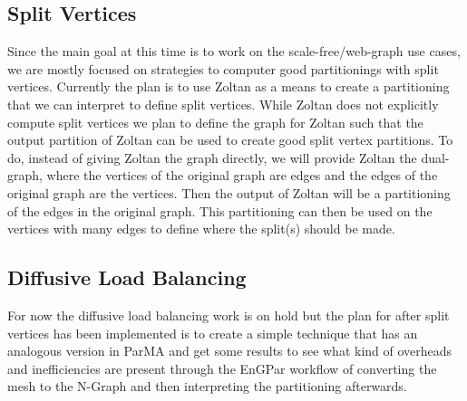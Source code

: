 \documentclass[12pt]{article}
\begin{document}
\subsection{Split Vertices}
Since the main goal at this time is to work on the scale-free/web-graph
use cases, we are mostly focused on strategies to computer good partitionings
with split vertices. Currently the plan is to use Zoltan as a means to create
a partitioning that we can interpret to define split vertices. While Zoltan
does not explicitly compute split vertices we plan to define the graph for
Zoltan such that the output partition of Zoltan can be used to create good
split vertex partitions. To do, instead of giving Zoltan the graph directly,
we will provide Zoltan the dual-graph, where the vertices of the original graph
are edges and the edges of the original graph are the vertices. Then the
output of Zoltan will be a partitioning of the edges in the original graph.
This partitioning can then be used on the vertices with many edges to define
where the split(s) should be made.

\subsection{Diffusive Load Balancing}
For now the diffusive load balancing work is on hold but the plan for
after split vertices has been implemented is to create a simple technique
that has an analogous version in ParMA and get some results to see what
kind of overheads and inefficiencies are present through the EnGPar workflow
of converting the mesh to the N-Graph and then interpreting the partitioning
afterwards.

%
%
\end{document}
